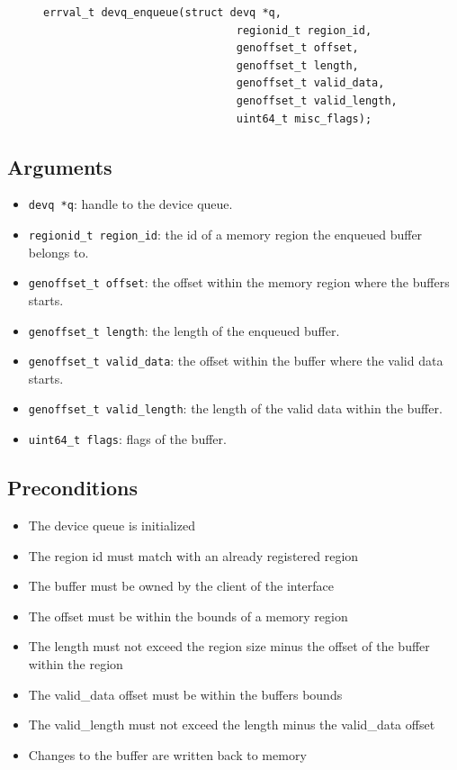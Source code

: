 \documentclass[a4paper,11pt,twoside]{report}
\begin{document}
	
	\begin{figure}[h]
		\begin{lstlisting}[style=code]
		errval_t devq_enqueue(struct devq *q,
		                      regionid_t region_id,
		                      genoffset_t offset,
		                      genoffset_t length,
		                      genoffset_t valid_data,
		                      genoffset_t valid_length,
		                      uint64_t misc_flags);
		\end{lstlisting}
		\label{lst:enqueue}
	\end{figure}
	
	\subsection*{Arguments}
	\begin{itemize}
		\item \texttt{devq *q}: handle to the device queue.
		\item \texttt{regionid\_t region\_id}: the id of a memory region the enqueued buffer belongs to.
		\item \texttt{genoffset\_t offset}: the offset within the memory region where the buffers starts. 
		\item \texttt{genoffset\_t length}: the length of the enqueued buffer.
		\item \texttt{genoffset\_t valid\_data}: the offset within the buffer where the valid data starts.
		\item \texttt{genoffset\_t valid\_length}: the length of the valid data within the buffer.
		\item \texttt{uint64\_t flags}: flags of the buffer. 
	\end{itemize}
	
	\subsection*{Preconditions}
	\begin{itemize}
		\item The device queue is initialized
		\item The region id must match with an already registered region
		\item The buffer must be owned by the client of the interface 
		\item The offset must be within the bounds of a memory region
		\item The length must not exceed the region size minus the offset of the buffer within the region
		\item The valid\_data offset must be within the buffers bounds
		\item The valid\_length must not exceed the length minus the valid\_data offset
		\item Changes to the buffer are written back to memory
	\end{itemize}
	
\end{document}
